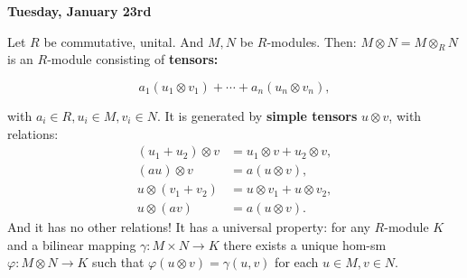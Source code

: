 \documentclass[9pt,reqno,twoside]{amsbook}
\theoremstyle{plain}
\numberwithin{section}{chapter}
\numberwithin{equation}{chapter}
\theoremstyle{definition}
\theoremstyle{remark}
\theoremstyle{plain}
\newcommand{\bee}{\begin{equation}\begin{aligned}}
\newcommand{\eee}{\end{aligned}\end{equation}}
\newcommand{\tens}{\otimes}
\renewcommand{\phi}{\varphi}
\begin{document}
 \textbf{Tuesday, January 23rd}
 
\vspace{5mm}

Let $R$ be commutative, unital. And $M,N$ be $R$-modules. Then:
$
M \otimes N = M \otimes_R N$ is an $R$-module consisting of \textbf{tensors: } 

$$
a_1(u_1 \otimes v_1) + \cdots + a_n(u_n \otimes v_n),
$$

with $a_i \in R,u_i \in M,v_i \in N$. It is generated by \textbf{simple tensors} $u \otimes v$, with relations: 
 \bee
  (u_1 + u_2) \otimes v &= u_1 \otimes v + u_2 \tens v,\\
 (au) \otimes v &= a(u \otimes v),\\
 u \otimes (v_1 + v_2) &= u\otimes v_1 
+ u\otimes v_2,\\
u\otimes (av) &= a(u \otimes v).
\eee
And it has no other relations! It has a universal property: for any $R$-module $K$ and a bilinear mapping $\gamma: M \times N \to K$ there exists a unique hom-sm $\phi:M \otimes N \to K$ such that $\phi(u \otimes v) = \gamma(u,v)$ for each $u \in M,v \in N$. 
\end{document}
